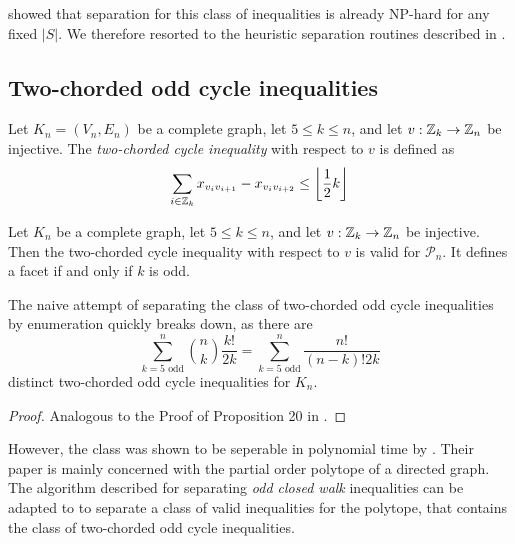 \cite{oostenCliquePartitioningProblem2001a} showed that separation for this class of inequalities is already \textsc{NP}-hard for any fixed $\lvert S \rvert$.
We therefore resorted to the heuristic separation routines described in \cite{grotschelFacetsCliquePartitioning1990}.

\subsection{Two-chorded odd cycle inequalities}\label{subsec:two_chorded_separator}
\begin{definition}\label{def:2-chorded_cycle_inequality}
	Let $K_{n} = (V_{n}, E_{n})$ be a complete graph, let $5 \leq k \leq n$, and let $v: \mathbb{Z}_{k} \to \mathbb{Z}_{n}$ be injective.
	The \textit{two-chorded cycle inequality} with respect to $v$ is defined as
	\begin{equation}\label{eq:two-chorded_cycle_inequality}
		\sum_{i \in \mathbb{Z}_{k}}^{} x_{v_{i}v_{i+1}} - x_{v_{i}v_{i+2}} \leq \left\lfloor \frac{1}{2} k \right\rfloor
	\end{equation}
\end{definition}
\begin{theorem}
	Let $K_{n}$ be a complete graph, let $5 \leq k \leq n$, and let $v: \mathbb{Z}_{k} \to \mathbb{Z}_{n}$ be injective.
	Then the two-chorded cycle inequality with respect to $v$ is valid for $\mathscr{P}_{n}$.
	It defines a facet if and only if $k$ is odd.
\end{theorem}

The naive attempt of separating the class of two-chorded odd cycle inequalities by enumeration quickly breaks down,
as there are 
\[
	\sum_{k=5 \text{ odd}}^{n} \binom{n}{k} \frac{k!}{2k} = \sum_{k = 5 \text{ odd}}^{n} \frac{n!}{(n-k)!2k}
\]
distinct two-chorded odd cycle inequalities for $K_{n}$.
\begin{proof}
	Analogous to the Proof of Proposition 20 in \cite{andresPolyhedralStudyLifted2022}.
\end{proof}

However, the class was shown to be seperable in polynomial time by \cite{mullerPartialOrderPolytope1996}.
Their paper is mainly concerned with the partial order polytope of a directed graph.
The algorithm described for separating \textit{odd closed walk} inequalities can be adapted to to separate a class of valid inequalities for the \CP polytope, that contains the class of two-chorded odd cycle inequalities.


